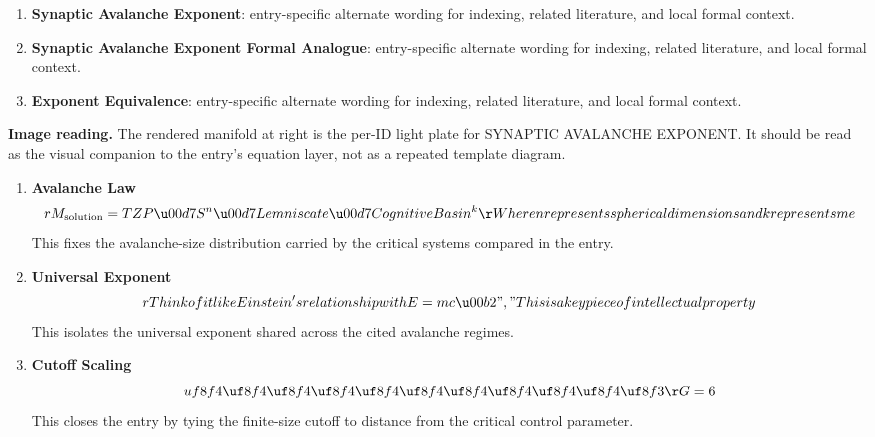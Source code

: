 \begin{enumerate}[leftmargin=1.6em,itemsep=6pt,topsep=4pt]
\item \textbf{Synaptic Avalanche Exponent}: entry-specific alternate wording for indexing, related literature, and local formal context.
\item \textbf{Synaptic Avalanche Exponent Formal Analogue}: entry-specific alternate wording for indexing, related literature, and local formal context.
\item \textbf{Exponent Equivalence}: entry-specific alternate wording for indexing, related literature, and local formal context.
\end{enumerate}

\begin{samepage}
\noindent\begin{minipage}[t]{0.45\linewidth}
\vspace{0pt}
\raggedright
\scriptsize\textbf{Image reading.} The rendered manifold at right is the per-ID light plate for SYNAPTIC AVALANCHE EXPONENT. It should be read as the visual companion to the entry's equation layer, not as a repeated template diagram.\par
\end{minipage}\hfill
\begin{minipage}[t]{0.53\linewidth}
\vspace*{-0.10in}
\raggedright
{}
\end{minipage}
\end{samepage}

\clearpage


\begin{enumerate}[leftmargin=1.6em,itemsep=9pt,topsep=6pt]
\item \textbf{Avalanche Law}
\[
r M_{\mathrm{solution}} = TZP \u00d7 S^n \u00d7 Lemniscate \u00d7 CognitiveBasin^k\r Where n represents spherical dimensions and k represents me
\]
This fixes the avalanche-size distribution carried by the critical systems compared in the entry.

\item \textbf{Universal Exponent}
\[
r Think of it like Einstein's relationship with E=mc\u00b2","This is a key piece of intellectual property
\]
This isolates the universal exponent shared across the cited avalanche regimes.

\item \textbf{Cutoff Scaling}
\[
uf8f4\uf8f4\uf8f4\uf8f4\uf8f4\uf8f4\uf8f4\uf8f4\uf8f4\uf8f4\uf8f3\r G = 6
\]
This closes the entry by tying the finite-size cutoff to distance from the critical control parameter.
\end{enumerate}

